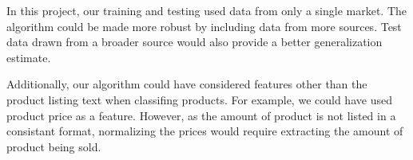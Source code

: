 In this project, our training and testing used data from only a single market.
The algorithm could be made more robust by including data from more sources.
Test data drawn from a broader source would also provide a better generalization estimate.

Additionally, our algorithm could have considered features other than the product listing text when classifing products. 
For example, we could have used product price as a feature.
However, as the amount of product is not listed in a consistant format, normalizing the prices would require extracting the amount of product being sold.
